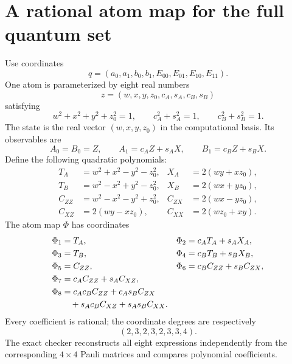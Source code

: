 \documentclass[11pt]{article}
\begin{document}
\section{A rational atom map for the full quantum set}
Use coordinates
\[
 q=(a_0,a_1,b_0,b_1,E_{00},E_{01},E_{10},E_{11}).
\]
One atom is parameterized by eight real numbers
\[
 z=(w,x,y,z_0,c_A,s_A,c_B,s_B)
\]
satisfying
\begin{equation}\label{eq:atom-constraints}
 w^2+x^2+y^2+z_0^2=1,\qquad
 c_A^2+s_A^2=1,\qquad c_B^2+s_B^2=1.
\end{equation}
The state is the real vector $(w,x,y,z_0)$ in the computational basis. Its observables are
\[
 A_0=B_0=Z,\qquad A_1=c_AZ+s_AX,\qquad B_1=c_BZ+s_BX.
\]
Define the following quadratic polynomials:
\begin{align*}
 T_A&=w^2+x^2-y^2-z_0^2,&X_A&=2(wy+xz_0),\\
 T_B&=w^2-x^2+y^2-z_0^2,&X_B&=2(wx+yz_0),\\
 C_{ZZ}&=w^2-x^2-y^2+z_0^2,&C_{ZX}&=2(wx-yz_0),\\
 C_{XZ}&=2(wy-xz_0),&C_{XX}&=2(wz_0+xy).
\end{align*}
The atom map $\Phi$ has coordinates
\begin{align}\label{eq:atom-map}
 \Phi_1&=T_A,&\Phi_2&=c_AT_A+s_AX_A,\notag\\
 \Phi_3&=T_B,&\Phi_4&=c_BT_B+s_BX_B,\notag\\
 \Phi_5&=C_{ZZ},&\Phi_6&=c_BC_{ZZ}+s_BC_{ZX},\notag\\
 \Phi_7&=c_AC_{ZZ}+s_AC_{XZ},&&\notag\\
 \Phi_8&=c_Ac_BC_{ZZ}+c_As_BC_{ZX}&&\notag\\
       &\quad+s_Ac_BC_{XZ}+s_As_BC_{XX}.&&
\end{align}
Every coefficient is rational; the coordinate degrees are respectively
\[
 (2,3,2,3,2,3,3,4).
\]
The exact checker reconstructs all eight expressions independently from the corresponding $4\times4$ Pauli matrices and compares polynomial coefficients.
\end{document}

